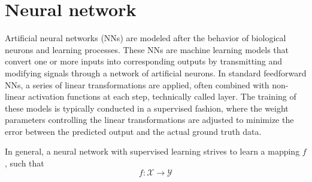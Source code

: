 



\section{Neural network}

Artificial neural networks (NNs) are modeled after the behavior of biological neurons and learning processes. These NNs are machine learning models that convert one or more inputs into corresponding outputs by transmitting and modifying signals through a network of artificial neurons. In standard feedforward NNs, a series of linear transformations are applied, often combined with non-linear activation functions at each step, technically called layer. The training of these models is typically conducted in a supervised fashion, where the weight parameters controlling the linear transformations are adjusted to minimize the error between the predicted output and the actual ground truth data.

In general, a neural network with supervised learning strives to learn a mapping $f$, such that
\begin{equation}
f : \mathcal{X} \rightarrow \mathcal{Y}
\end{equation}

